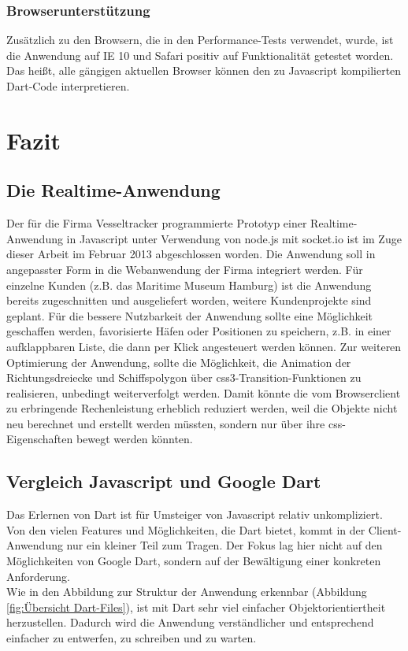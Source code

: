 \subsection{Browserunterstützung}
Zusätzlich zu den Browsern, die in den Performance-Tests verwendet, wurde, ist die Anwendung auf IE 10 und Safari positiv auf Funktionalität getestet worden. Das heißt, alle gängigen aktuellen Browser können den zu Javascript kompilierten Dart-Code interpretieren.

\chapter{Fazit}\label{Fazit}

\section{Die Realtime-Anwendung}
Der für die Firma Vesseltracker programmierte Prototyp einer Realtime-Anwendung in Javascript unter Verwendung von node.js mit socket.io ist im Zuge dieser Arbeit im Februar 2013 abgeschlossen worden. Die Anwendung soll in angepasster Form in die Webanwendung der Firma integriert werden. Für einzelne Kunden (z.B. das Maritime Museum Hamburg) ist die Anwendung bereits zugeschnitten und ausgeliefert worden, weitere Kundenprojekte sind geplant.
Für die bessere Nutzbarkeit der Anwendung sollte eine Möglichkeit geschaffen werden, favorisierte Häfen oder Positionen zu speichern, z.B. in einer aufklappbaren Liste, die dann per Klick angesteuert werden können.
Zur weiteren Optimierung der Anwendung, sollte die Möglichkeit, die Animation der Richtungsdreiecke und Schiffspolygon über css3-Transition-Funktionen zu realisieren, unbedingt weiterverfolgt werden. Damit könnte die vom Browserclient zu erbringende Rechenleistung erheblich reduziert werden, weil die Objekte nicht neu berechnet und erstellt werden müssten, sondern nur über ihre css-Eigenschaften bewegt werden könnten.

\section{Vergleich Javascript und Google Dart}
Das Erlernen von Dart ist für Umsteiger von Javascript relativ unkompliziert. Von den vielen Features und Möglichkeiten, die Dart bietet, kommt in der Client-Anwendung nur ein kleiner Teil zum Tragen. Der Fokus lag hier nicht auf den Möglichkeiten von Google Dart, sondern auf der Bewältigung einer konkreten Anforderung. \\
Wie in den Abbildung zur Struktur der Anwendung erkennbar (Abbildung \ref{fig:Übersicht Dart-Files}), ist mit Dart sehr viel einfacher Objektorientiertheit herzustellen. Dadurch wird die Anwendung verständlicher und entsprechend einfacher zu entwerfen, zu schreiben und zu warten.

